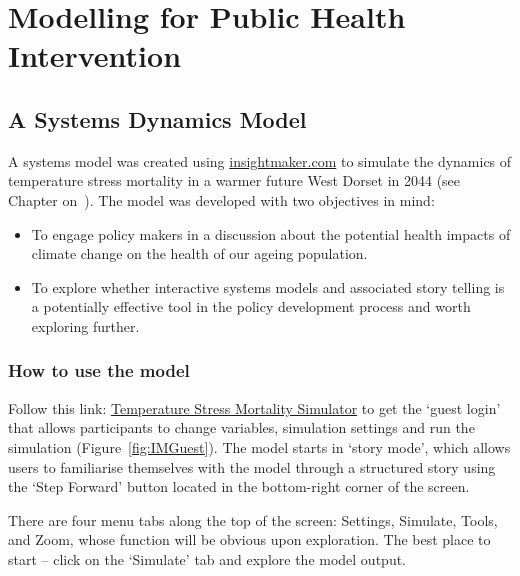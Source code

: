 \chapter{Modelling for Public Health Intervention}

\section{A Systems Dynamics Model}
A systems model was created using \url{insightmaker.com} to simulate the dynamics of temperature stress mortality in a warmer future West Dorset in 2044 (see Chapter on~). The model was developed with two objectives in mind:
\begin{itemize}
\item To engage policy makers in a discussion about the potential health impacts of climate change on the health of our ageing population.
\item To explore whether interactive systems models and associated story telling is a potentially effective tool in the policy development process and worth exploring further.
\end{itemize}

\subsection{How to use the model}
Follow this link: \href{https://insightmaker.com/insight/33655/Temperature-Stress-Mortality-Simulator}{Temperature Stress Mortality Simulator} to get the `guest login' that allows participants to change variables, simulation settings and run the simulation (Figure~\ref{fig:IMGuest}). The model starts in `story mode', which allows users to familiarise themselves with the model through a structured story using the `Step Forward' button located in the bottom-right corner of the screen.

There are four menu tabs along the top of the screen: Settings, Simulate, Tools, and Zoom, whose function will be obvious upon exploration. The best place to start -- click on the `Simulate' tab and explore the model output.

